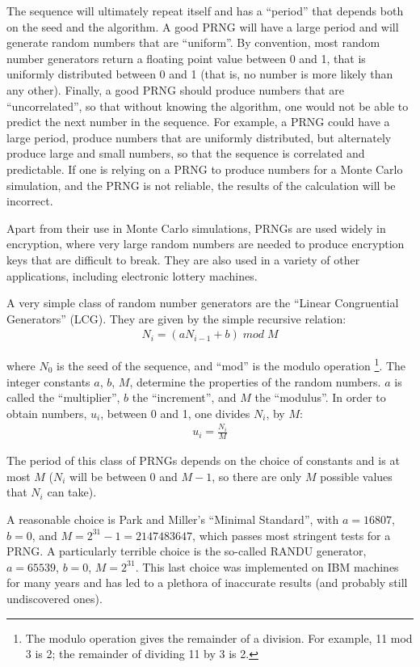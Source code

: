 The sequence will ultimately repeat itself and has a ``period'' that depends both on the seed and the algorithm. A good PRNG will have a large period and will generate random numbers that are ``uniform''. By convention, most random number generators return a floating point value between 0 and 1, that is uniformly distributed between 0 and 1 (that is, no number is more likely than any other). Finally, a good PRNG should produce numbers that are ``uncorrelated'', so that without knowing the algorithm, one would not be able to predict the next number in the sequence. For example, a PRNG could have a large period, produce numbers that are uniformly distributed, but alternately produce large and small numbers, so that the sequence is correlated and predictable. If one is relying on a PRNG to produce numbers for a Monte Carlo simulation, and the PRNG is not reliable, the results of the calculation will be incorrect.

Apart from their use in Monte Carlo simulations, PRNGs are used widely in encryption, where very large random numbers are needed to produce encryption keys that are difficult to break. They are also used in a variety of other applications, including electronic lottery machines.

A very simple class of random number generators are the ``Linear Congruential Generators'' (LCG). They are given by the simple recursive relation:
\begin{align*}
 N_i = (aN_{i-1} + b) \; mod \; M 
\end{align*}

where $N_0$ is the seed of the sequence, and ``mod'' is the modulo operation \footnote{The modulo operation gives the remainder of a division. For example, 11 mod 3 is 2; the remainder of dividing 11 by 3 is 2.}. The integer constants $a$, $b$, $M$, determine the properties of the random numbers. $a$ is called the ``multiplier'', $b$ the ``increment'', and $M$ the ``modulus''. In order to obtain numbers, $u_i$, between 0 and 1, one divides $N_i$, by $M$:
\begin{align*}
 u_i = \frac{N_i}{M}
\end{align*}

The period of this class of PRNGs depends on the choice of constants and is at most $M$ ($N_i$ will be between 0 and $M-1$, so there are only $M$ possible values that $N_i$ can take).

A reasonable choice is Park and Miller's ``Minimal Standard'', with $a=16807$, $b=0$, and $M=2^{31}-1=2147483647$, which passes most stringent tests for a PRNG. A particularly terrible choice is the so-called RANDU generator, $a=65539$, $b=0$, $M=2^{31}$. This last choice was implemented on IBM machines for many years and has led to a plethora of inaccurate results (and probably still undiscovered ones).  

